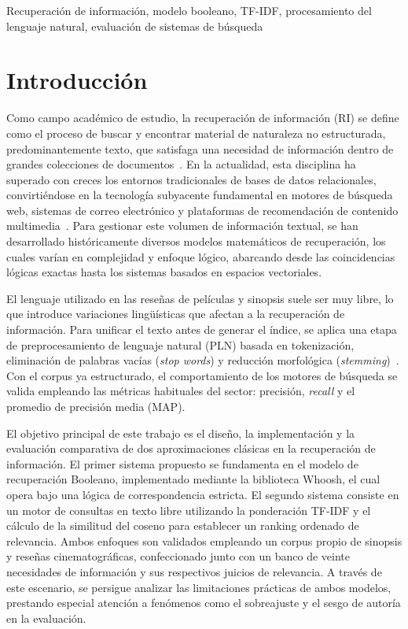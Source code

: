 \documentclass[conference,a4paper]{IEEEtran}
\begin{document}
\begin{IEEEkeywords}
  Recuperación de información, modelo booleano, TF-IDF, 
  procesamiento del lenguaje natural, evaluación de sistemas de búsqueda
\end{IEEEkeywords}


\section{Introducción}

Como campo académico de estudio, la recuperación de información (RI) se define 
como el proceso de buscar y encontrar material de naturaleza no estructurada, 
predominantemente texto, que satisfaga una necesidad de información dentro de 
grandes colecciones de documentos~\cite{b1}. En la actualidad, esta disciplina ha 
superado con creces los entornos tradicionales de bases de datos relacionales, 
convirtiéndose en la tecnología subyacente fundamental en motores de búsqueda web, 
sistemas de correo electrónico y plataformas de recomendación de contenido 
multimedia~\cite{b2}. Para gestionar este volumen de información textual, se han 
desarrollado históricamente diversos modelos matemáticos de recuperación, los 
cuales varían en complejidad y enfoque lógico, abarcando desde las coincidencias 
lógicas exactas hasta los sistemas basados en espacios vectoriales.

El lenguaje utilizado en las reseñas de películas y sinopsis suele ser muy libre, lo que introduce variaciones lingüísticas que afectan a la recuperación de información. Para unificar el texto antes de generar el índice, se aplica una etapa de preprocesamiento de lenguaje natural (PLN) basada en tokenización, eliminación de palabras vacías (\textit{stop words}) y reducción morfológica (\textit{stemming})~\cite{b3}. Con el corpus ya estructurado, el comportamiento de los motores de búsqueda se valida empleando las métricas habituales del sector: precisión, \textit{recall} y el promedio de precisión media (MAP).

El objetivo principal de este trabajo es el diseño, la implementación y la evaluación 
comparativa de dos aproximaciones clásicas en la recuperación de información. El 
primer sistema propuesto se fundamenta en el modelo de recuperación Booleano, 
implementado mediante la biblioteca Whoosh, el cual opera bajo una lógica de 
correspondencia estricta. El segundo sistema consiste en un motor de consultas en 
texto libre utilizando la ponderación TF-IDF y el cálculo de la similitud del coseno 
para establecer un ranking ordenado de relevancia. Ambos enfoques son validados 
empleando un corpus propio de sinopsis y reseñas cinematográficas, confeccionado 
junto con un banco de veinte necesidades de información y sus respectivos juicios de 
relevancia. A través de este escenario, se persigue analizar las limitaciones 
prácticas de ambos modelos, prestando especial atención a fenómenos como el 
sobreajuste y el sesgo de autoría en la evaluación.
\end{document}
